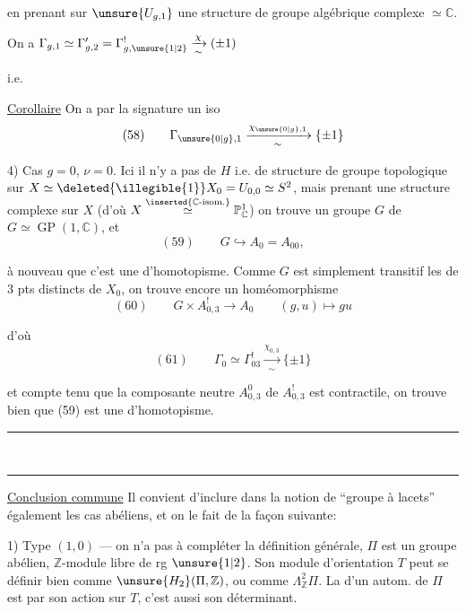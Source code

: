 en prenant sur $\unsure{U_{g,1}}$ une structure de groupe algébrique complexe $\simeq\mathbb{C}$.

On a  $\Gamma_{g,1}\simeq\Gamma'_{g,2}=\Gamma^!_{g,\unsure{1|2}}\xrightarrow[\sim]{\chi}(\pm1)$

i.e.

\uline{Corollaire} On a par la signature un iso
\[
(58)\qquad\Gamma_{\unsure{0|g},1}\xrightarrow[\sim]{\chi_{\unsure{0|g},1}}\{\pm1\}
\]

4) Cas $g=0$, $\nu=0$. Ici il n'y a pas de $H$ i.e. de structure de groupe topologique sur $X\simeq\deleted{\illegible{1}}X_0=U_{0,0}\simeq S^2$, mais prenant une structure complexe sur $X$ (d'où $X\overset{\inserted{\mathbb{C}\text{-isom.}}}{\simeq}\mathbb{P}^1_{\mathbb{C}}$) on trouve un groupe $G$ de   $G\simeq\operatorname{GP}(1,\mathbb{C})$, et
\[
(59)\qquad G\hookrightarrow A_0=A_{00},
\]

 à nouveau que c'est une  d'homotopisme. Comme $G$ est simplement transitif  les   de $3$ pts distincts de $X_0$, on trouve encore un homéomorphisme
\[
(60)\qquad G\times A^!_{0,3}\longrightarrow A_0\qquad(g,u)\longmapsto gu
\]

d'où
\[
(61)\qquad\Gamma_0\simeq\Gamma^!_{03}\xrightarrow[\sim]{\chi_{0,3}}\{\pm1\}
\]

et compte tenu que la composante neutre $A^0_{0,3}$ de $A^!_{0,3}$ est contractile, on trouve bien  que (59) est une  d'homotopisme.
\begin{center}\rule{1.2cm}{0.25pt}\\[-0.8em]\rule{1.2cm}{0.25pt}\end{center}

\uline{Conclusion commune}  Il convient d'inclure dans la notion de ``groupe à lacets'' également les  cas abéliens, et on le fait de la façon suivante:

1) Type $(1,0)$ --- on n'a pas à compléter la définition générale,  $\Pi$ est un groupe abélien, $\mathbb{Z}$-module libre de rg $\unsure{1|2}$. Son module d'orientation $T$ peut se définir bien comme $\unsure{H_2}(\Pi,\mathbb{Z})$, ou comme $\Lambda^2_{\mathbb{Z}}\Pi$. La   d'un autom. de $\Pi$ est  par son action sur $T$, c'est aussi son déterminant.


